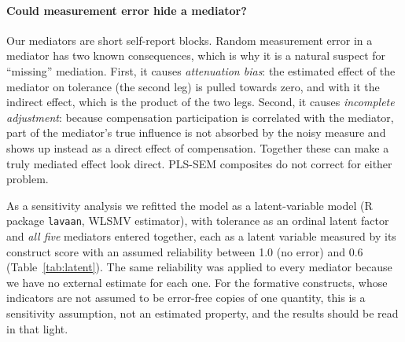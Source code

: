 \paragraph{Could measurement error hide a mediator?} Our mediators are short
self-report blocks. Random measurement error in a mediator has two known
consequences, which is why it is a natural suspect for ``missing'' mediation.
First, it causes \emph{attenuation bias}: the estimated effect of the
mediator on tolerance (the second leg) is pulled towards zero, and with it
the indirect effect, which is the product of the two legs. Second, it causes
\emph{incomplete adjustment}: because compensation participation is
correlated with the mediator, part of the mediator's true influence is not
absorbed by the noisy measure and shows up instead as a direct effect of
compensation. Together these can make a truly mediated effect look direct.
PLS-SEM composites do not correct for either problem.

As a sensitivity analysis we refitted the model as a latent-variable model
(R package \texttt{lavaan}, WLSMV estimator), with tolerance as an ordinal
latent factor and \emph{all five} mediators entered together, each as a latent
variable measured by its construct score with an assumed reliability between
1.0 (no error) and 0.6 (Table~\ref{tab:latent}). The same reliability was
applied to every mediator because we have no external estimate for each one.
For the formative constructs, whose indicators are not assumed to be
error-free copies of one quantity, this is a sensitivity assumption, not an
estimated property, and the results should be read in that light.

